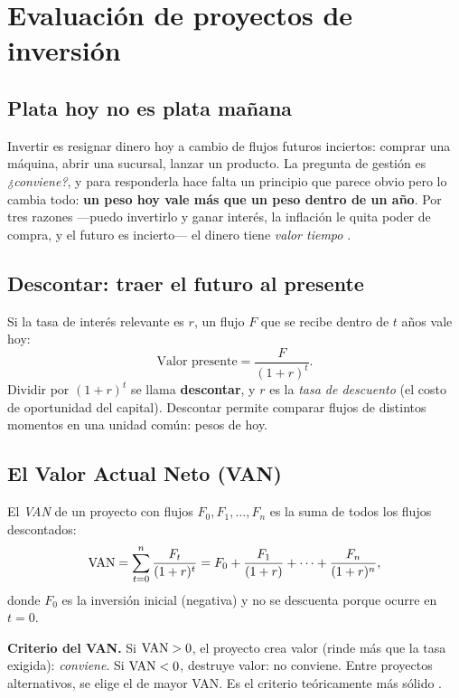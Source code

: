 \chapter{Evaluación de proyectos de inversión}
\label{cap:inversiones}

\section{Plata hoy no es plata mañana}

Invertir es resignar dinero hoy a cambio de flujos futuros inciertos: comprar una máquina, abrir una sucursal, lanzar un producto. La pregunta de gestión es \emph{¿conviene?}, y para responderla hace falta un principio que parece obvio pero lo cambia todo: \textbf{un peso hoy vale más que un peso dentro de un año}. Por tres razones —puedo invertirlo y ganar interés, la inflación le quita poder de compra, y el futuro es incierto— el dinero tiene \emph{valor tiempo} \cite{brealey}.

\section{Descontar: traer el futuro al presente}

Si la tasa de interés relevante es $r$, un flujo $F$ que se recibe dentro de $t$ años vale hoy:
\begin{equation}
\text{Valor presente} = \frac{F}{(1+r)^{t}}.
\end{equation}
Dividir por $(1+r)^t$ se llama \textbf{descontar}, y $r$ es la \emph{tasa de descuento} (el costo de oportunidad del capital). Descontar permite comparar flujos de distintos momentos en una unidad común: pesos de hoy.

\section{El Valor Actual Neto (VAN)}

\begin{definicion}
El \emph{VAN} de un proyecto con flujos $F_0, F_1,\dots,F_n$ es la suma de todos los flujos descontados:
\[
\mathrm{VAN} = \sum_{t=0}^{n}\frac{F_t}{(1+r)^{t}} = F_0 + \frac{F_1}{(1+r)} + \cdots + \frac{F_n}{(1+r)^{n}},
\]
donde $F_0$ es la inversión inicial (negativa) y no se descuenta porque ocurre en $t=0$.
\end{definicion}

\begin{ideabox}
\textbf{Criterio del VAN.} Si $\mathrm{VAN} > 0$, el proyecto crea valor (rinde más que la tasa exigida): \emph{conviene}. Si $\mathrm{VAN}<0$, destruye valor: no conviene. Entre proyectos alternativos, se elige el de mayor VAN. Es el criterio teóricamente más sólido \cite{brealey}.
\end{ideabox}

